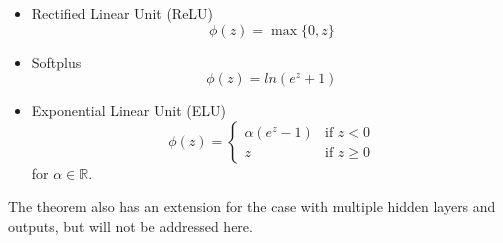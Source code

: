 \begin{itemize}
    \item Rectified Linear Unit (ReLU)
    \[
        \phi(z) = \max\{0, z\}    
    \]
    \item Softplus
    \[
        \phi(z) = ln(e^z+1)
    \]
    \item Exponential Linear Unit (ELU)
    \begin{equation*}
        \phi(z)=
            \begin{cases}
                \alpha(e^z-1) & \text{if } z < 0 \\
                z & \text{if } z \geq 0
            \end{cases}
    \end{equation*}
    for $\alpha \in \mathbb{R}$.
\end{itemize}

The theorem also has an extension for the case with multiple hidden layers and outputs, but will not be addressed here.